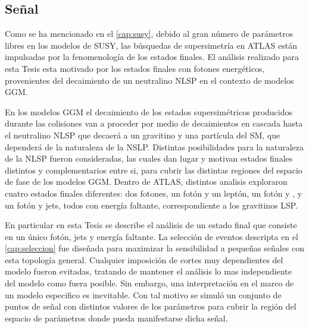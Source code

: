 


\subsection{Se\~nal}

Como se ha mencionado en el \cref{cap:susy}, debido al gran número de parámetros
libres en los modelos de SUSY, las búsquedas de supersimetría en ATLAS están
impulsadas por la fenomenología de los estados finales. El análisis realizado
para esta Tesis esta motivado por los estados finales con fotones
energéticos, provenientes del decaimiento de un neutralino NLSP en el contexto
de modelos GGM.

En los modelos GGM el decaimiento de los estados supersimétricos producidos
durante las colisiones van a proceder por medio de decaimientos en cascada hasta
el neutralino NLSP que decaerá a un gravitino y una partícula del SM,
que dependerá de la naturaleza de la NSLP. Distintas posibilidades para la
naturaleza de la NLSP fueron consideradas, las cuales dan lugar y motivan
estados finales distintos y complementarios entre si, para cubrir las distintas
regiones del espacio de fase de los modelos GGM. Dentro de ATLAS, distintos
analisis exploraron cuatro estados finales diferentes: dos fotones, un fotón y
un leptón, un fotón y {\bjets}, y un fotón y jets, todos con energía faltante,
correspondiente a los gravitinos LSP.

En particular en esta Tesis se describe el análisis de un estado final que
consiste en un único fotón, jets y energía faltante.
La selección de eventos descripta en el \cref{cap:seleccion} fue diseñada para
maximizar la sensibilidad a pequeñas señales con esta topología general.
Cualquier imposición de cortes muy dependientes del modelo fueron evitadas,
tratando de mantener el análisis lo mas independiente del modelo como fuera
posible. Sin embargo, una interpretación en el marco de un modelo especifico es
inevitable. Con tal motivo se simuló un conjunto de puntos de señal con
distintos valores de los parámetros para cubrir la región del espacio de
parámetros donde pueda manifestarse dicha señal.

